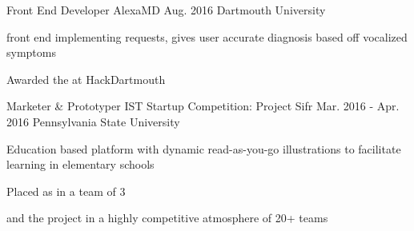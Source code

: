 

\begin{cventries}

%
  \cventry
    {Front End Developer} %
    {AlexaMD} %
    {Aug. 2016} %
    {Dartmouth University} %
    {
      \begin{cvitems} %
        \item {  front end implementing  requests, gives user accurate diagnosis based off vocalized symptoms}
        \item {Awarded the  at HackDartmouth}
      \end{cvitems}
    }
  \cventry
    {Marketer \& Prototyper} %
    {IST Startup Competition: Project Sifr} %
    {Mar. 2016 - Apr. 2016} %
    {Pennsylvania State University} %
    {
      \begin{cvitems} %
      \item {Education based platform with dynamic read-as-you-go illustrations to facilitate  learning in elementary schools }
        \item { Placed as  in a team of 3}
        \item { and  the project in a highly competitive atmosphere of 20+ teams}

\end{cvitems}}
\end{cventries}
